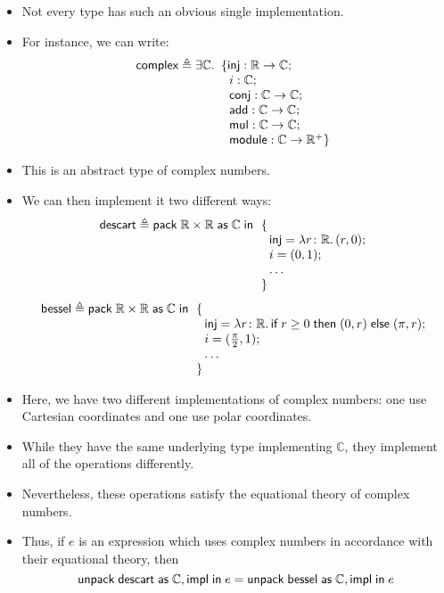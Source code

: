 \documentclass{lecturenotes}
\newcommand{\tabs}[3]{\ensuremath{\lambda #1 \colon #2.\,#3}}
\newcommand{\extype}[2]{\ensuremath{\exists #1.\,#2}}
\newcommand{\pack}[3]{\ensuremath{\textsf{pack}\mkern5mu#1\mathrel{\textsf{as}}#2\mathrel{\textsf{in}}#3}}
\newcommand{\unpack}[4]{\ensuremath{\textsf{unpack}\mkern5mu#1\mathrel{\textsf{as}} #2, #3 \mathrel{\textsf{in}} #4}}
\begin{document}
\begin{itemize}
\item Not every type has such an obvious single implementation.
\item For instance, we can write:
  $$
  \textsf{complex} \triangleq \extype{\mathbb{C}}{\begin{array}[t]{@{\hspace{1em}}l}\hspace{-0.65em}\{\textsf{inj} : \mathbb{R} \to \mathbb{C};\\ i : \mathbb{C};\\ \textsf{conj} : \mathbb{C} \to \mathbb{C};\\ \textsf{add} : \mathbb{C} \to \mathbb{C};\\ \textsf{mul} : \mathbb{C} \to \mathbb{C};\\ \textsf{module} : \mathbb{C} \to \mathbb{R}^+\}}\end{array}
  $$
\item This is an abstract type of complex numbers. 
\item We can then implement it two different ways:
  $$
  \textsf{descart} \triangleq \pack{\mathbb{R} \times \mathbb{R}}{\mathbb{C}}{\begin{array}[t]{@{\hspace{1em}}l}\hspace{-0.65em}\{\\
    \textsf{inj} = \tabs{r}{\mathbb{R}}{(r, 0)};\\
    i = (0, 1);\\
    \dots\\
    \hspace{-0.65em}\}\end{array}}
$$
$$
\textsf{bessel} \triangleq \pack{\mathbb{R} \times \mathbb{R}}{\mathbb{C}}{\begin{array}[t]{@{\hspace{1em}}l}\hspace{-0.65em}\{\\
  \textsf{inj} = \tabs{r}{\mathbb{R}}{\textsf{if}\mkern5mur \geq 0 \mathrel{\textsf{then}} (0, r) \mathrel{\textsf{else}} (\pi, r)};\\
  i = (\frac{\pi}{2}, 1);\\
  \dots\\
  \hspace{-0.65em}\}\end{array}}
$$
\item Here, we have two different implementations of complex numbers: one use Cartesian coordinates and one use polar coordinates.
\item While they have the same underlying type implementing $\mathbb{C}$, they implement all of the operations differently.
\item Nevertheless, these operations satisfy the equational theory of complex numbers.
\item Thus, if $e$ is an expression which uses complex numbers in accordance with their equational theory, then $$\unpack{\textsf{descart}}{\mathbb{C}}{\textsf{impl}}{e} = \unpack{\textsf{bessel}}{\mathbb{C}}{\textsf{impl}}{e}$$
\end{itemize}
\end{document}
